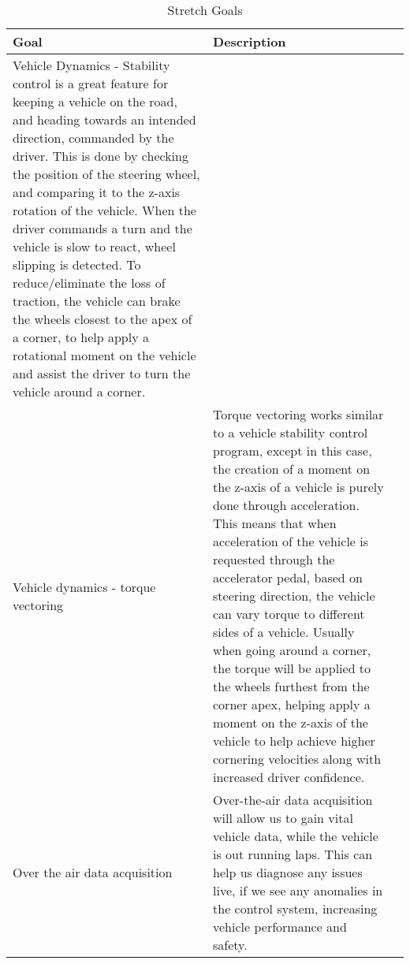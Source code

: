 \documentclass{article}
\begin{document}
\begin{table}[hp]
\caption{Stretch Goals} \label{TblStretchGoals}
\begin{tabularx}{\textwidth}{llX}
\toprule
\textbf{Goal} & \textbf{Description}\\
\midrule
Vehicle Dynamics - Stability control is a great feature for keeping a 
vehicle on the road, and heading towards an intended direction, commanded 
by the driver. This is done by checking the position of the steering wheel, 
and comparing it to the z-axis rotation of the vehicle. When the driver 
commands a turn and the vehicle is slow to react, wheel slipping is detected. 
To reduce/eliminate the loss of traction, the vehicle can brake the wheels 
closest to the apex of a corner, to help apply a rotational moment on the 
vehicle and assist the driver to turn the vehicle around a corner. \\
Vehicle dynamics - torque vectoring & Torque vectoring works similar to a 
vehicle stability control program, except in this case, the creation of a 
moment on the z-axis of a vehicle is purely done through acceleration. This 
means that when acceleration of the vehicle is requested through the accelerator 
pedal, based on steering direction, the vehicle can vary torque to different sides 
of a vehicle. Usually when going around a corner, the torque will be applied to 
the wheels furthest from the corner apex, helping apply a moment on the z-axis of 
the vehicle to help achieve higher cornering velocities along with increased driver 
confidence.\\
Over the air data acquisition & Over-the-air data acquisition will allow us to 
gain vital vehicle data, while the vehicle is out running laps. This can help 
us diagnose any issues live, if we see any anomalies in the control system, 
increasing vehicle performance and safety.\\
\bottomrule
\end{tabularx}
\end{table}
\end{document}
